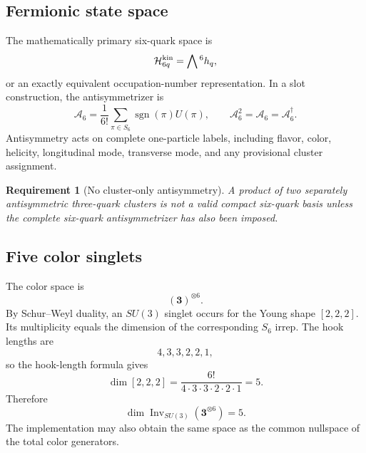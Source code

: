 \documentclass[11pt]{article}
\newtheorem{requirement}[definition]{Requirement}
\newcommand{\Hil}{\mathcal H}
\newcommand{\cA}{\mathcal A}
\begin{document}
\subsection{Fermionic state space}

The mathematically primary six-quark space is
\begin{equation}
 \Hil_{6q}^{\rm kin}=\bigwedge{}^6 h_q,
\label{eq:sixq-wedge}
\end{equation}
or an exactly equivalent occupation-number representation.  In a slot construction, the antisymmetrizer is
\begin{equation}
 \cA_6
 =\frac1{6!}\sum_{\pi\in S_6}
 \operatorname{sgn}(\pi)U(\pi),
 \qquad
 \cA_6^2=\cA_6=\cA_6^\dagger.
\label{eq:sixq-antisymmetrizer}
\end{equation}
Antisymmetry acts on complete one-particle labels, including flavor, color, helicity, longitudinal mode, transverse mode, and any provisional cluster assignment.

\begin{requirement}[No cluster-only antisymmetry]
A product of two separately antisymmetric three-quark clusters is not a valid compact six-quark basis unless the complete six-quark antisymmetrizer has also been imposed.
\label{req:no-cluster-only-antisym}
\end{requirement}

\subsection{Five color singlets}

The color space is
\begin{equation}
 \left(\bm3\right)^{\otimes6}.
\label{eq:sixq-color-space}
\end{equation}
By Schur--Weyl duality, an \(SU(3)\) singlet occurs for the Young shape \([2,2,2]\).  Its multiplicity equals the dimension of the corresponding \(S_6\) irrep.  The hook lengths are
\begin{equation}
 4,3,3,2,2,1,
\label{eq:222-hooks}
\end{equation}
so the hook-length formula gives
\begin{equation}
 \dim[2,2,2]
 =\frac{6!}{4\cdot3\cdot3\cdot2\cdot2\cdot1}
 =5.
\label{eq:sixq-singlet-multiplicity}
\end{equation}
Therefore
\begin{equation}
 \boxed{
 \dim\operatorname{Inv}_{SU(3)}
 \left(\bm3^{\otimes6}\right)=5
 }.
\label{eq:sixq-five}
\end{equation}
The implementation may also obtain the same space as the common nullspace of the total color generators.
\end{document}
